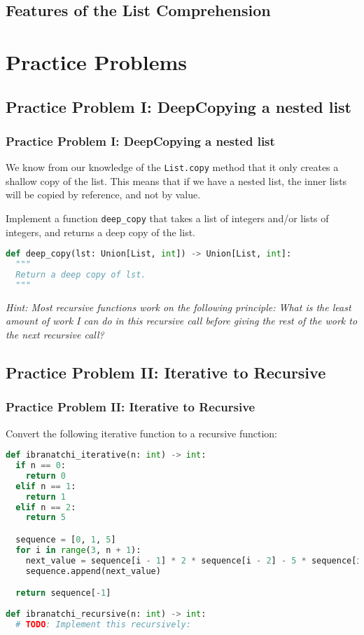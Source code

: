\documentclass[hyperref={colorlinks,citecolor=blue,linkcolor=blue,urlcolor=blue}]{beamer}
\begin{document}
\subsection{Features of the List Comprehension}

\section{Practice Problems}
\subsection{Practice Problem I: DeepCopying a nested list}
\begin{frame}[fragile]
  \frametitle{Practice Problem I: DeepCopying a nested list}
  We know from our knowledge of the \texttt{List.copy} method that it only creates a shallow copy of the list. This means that if we have a nested list, the inner lists will be copied by reference, and not by value.

  Implement a function \texttt{deep\_copy} that takes a list of integers and/or lists of integers, and returns a deep copy of the list.
  \begin{lstlisting}[language=Python, caption=Method signature of the deep\_copy method, style=mystyle]
def deep_copy(lst: Union[List, int]) -> Union[List, int]:
  """
  Return a deep copy of lst.
  """
  \end{lstlisting}

  \textit{Hint: Most recursive functions work on the following principle: What is the least amount of work I can do in this recursive call before giving the rest of the work to the next recursive call?}

\end{frame}

\subsection{Practice Problem II: Iterative to Recursive}

\begin{frame}[fragile]
  \frametitle{Practice Problem II: Iterative to Recursive}
  
  Convert the following iterative function to a recursive function:

  \begin{lstlisting}[language=Python, style=mystyle]
def ibranatchi_iterative(n: int) -> int:
  if n == 0:
    return 0
  elif n == 1:
    return 1
  elif n == 2:
    return 5

  sequence = [0, 1, 5]
  for i in range(3, n + 1):
    next_value = sequence[i - 1] * 2 * sequence[i - 2] - 5 * sequence[i - 3]
    sequence.append(next_value)

  return sequence[-1]
 
def ibranatchi_recursive(n: int) -> int:
  # TODO: Implement this recursively:

  \end{lstlisting}
\end{frame}
\end{document}
